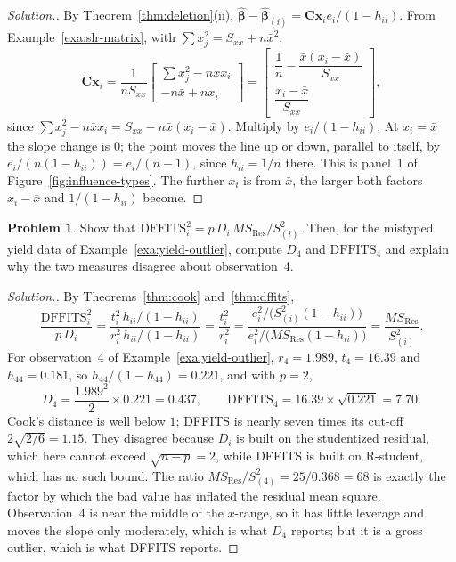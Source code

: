 \documentclass[11pt,a4paper]{article}
\numberwithin{equation}{section}
\theoremstyle{definition}
\newtheorem{problemx}{Problem}[subsection]
\newenvironment{problem}{\begin{problemx}}{\end{problemx}}
\newenvironment{solution}
  {\renewcommand{\qedsymbol}{}\begin{proof}[\textit{Solution}.]}
  {\end{proof}}
\begin{document}
\begin{solution}
By Theorem~\ref{thm:deletion}(ii), $\hat{\boldsymbol\beta} - \hat{\boldsymbol\beta}_{(i)} = \mathbf{C}\mathbf{x}_i e_i/(1 - h_{ii})$.
From Example~\ref{exa:slr-matrix}, with $\sum x_j^2 = S_{xx} + n\bar x^2$,
\[
\mathbf{C}\mathbf{x}_i = \frac{1}{nS_{xx}}\begin{bmatrix} \sum x_j^2 - n\bar x x_i \\ -n\bar x + n x_i \end{bmatrix}
= \begin{bmatrix} \dfrac{1}{n} - \dfrac{\bar x(x_i - \bar x)}{S_{xx}} \\[2mm] \dfrac{x_i - \bar x}{S_{xx}} \end{bmatrix} ,
\]
since $\sum x_j^2 - n\bar x x_i = S_{xx} - n\bar x(x_i - \bar x)$. Multiply by $e_i/(1 - h_{ii})$.
At $x_i = \bar x$ the slope change is $0$; the point moves the line up or down, parallel to
itself, by $e_i/(n(1 - h_{ii})) = e_i/(n - 1)$, since $h_{ii} = 1/n$ there. This is panel~1 of
Figure~\ref{fig:influence-types}. The further $x_i$ is from $\bar x$, the larger both factors
$x_i - \bar x$ and $1/(1 - h_{ii})$ become.
\end{solution}

\begin{problem}\label{prob:dffits-cook}
Show that $\mathrm{DFFITS}_i^2 = p\,D_i\,MS_{\mathrm{Res}}/S^2_{(i)}$. Then, for the mistyped
yield data of Example~\ref{exa:yield-outlier}, compute $D_4$ and $\mathrm{DFFITS}_4$
and explain why the two measures disagree about observation~4.
\end{problem}

\begin{solution}
By Theorems~\ref{thm:cook} and~\ref{thm:dffits},
\[
\frac{\mathrm{DFFITS}_i^2}{p\,D_i} = \frac{t_i^2\,h_{ii}/(1 - h_{ii})}{r_i^2\,h_{ii}/(1 - h_{ii})}
= \frac{t_i^2}{r_i^2} = \frac{e_i^2/\bigl(S^2_{(i)}(1 - h_{ii})\bigr)}{e_i^2/\bigl(MS_{\mathrm{Res}}(1 - h_{ii})\bigr)} = \frac{MS_{\mathrm{Res}}}{S^2_{(i)}} .
\]
For observation~4 of Example~\ref{exa:yield-outlier}, $r_4 = 1.989$, $t_4 = 16.39$ and
$h_{44} = 0.181$, so $h_{44}/(1 - h_{44}) = 0.221$, and with $p = 2$,
\[
D_4 = \frac{1.989^2}{2} \times 0.221 = 0.437, \qquad
\mathrm{DFFITS}_4 = 16.39 \times \sqrt{0.221} = 7.70 .
\]
Cook's distance is well below $1$; DFFITS is nearly seven times its cut-off
$2\sqrt{2/6} = 1.15$. They disagree because $D_i$ is built on the studentized residual, which
here cannot exceed $\sqrt{n - p} = 2$, while DFFITS is built on R-student, which has no such
bound. The ratio $MS_{\mathrm{Res}}/S^2_{(4)} = 25/0.368 = 68$ is exactly the factor by which the
bad value has inflated the residual mean square. Observation~4 is near the middle of the
$x$-range, so it has little leverage and moves the slope only moderately, which is what $D_4$
reports; but it is a gross outlier, which is what DFFITS reports.
\end{solution}
\end{document}
